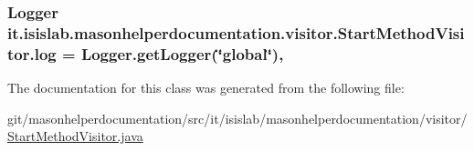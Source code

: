 \hypertarget{classit_1_1isislab_1_1masonhelperdocumentation_1_1visitor_1_1_start_method_visitor_a5148d3b6765bf49ed2c8c437c14d16e8}{
\subsubsection[{log}]{\setlength{\rightskip}{0pt plus 5cm}Logger it.\-isislab.\-masonhelperdocumentation.\-visitor.\-Start\-Method\-Visitor.\-log = Logger.\-get\-Logger(\char`\"{}global\char`\"{})\hspace{0.3cm}{\ttfamily [static]}, {\ttfamily [private]}}}\label{classit_1_1isislab_1_1masonhelperdocumentation_1_1visitor_1_1_start_method_visitor_a5148d3b6765bf49ed2c8c437c14d16e8}


The documentation for this class was generated from the following file\-:\begin{DoxyCompactItemize}
\item 
git/masonhelperdocumentation/src/it/isislab/masonhelperdocumentation/visitor/\hyperlink{_start_method_visitor_8java}{Start\-Method\-Visitor.\-java}\end{DoxyCompactItemize}
